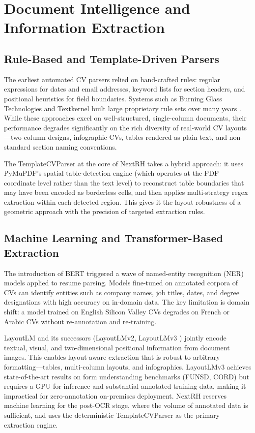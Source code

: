 \documentclass[12pt,a4paper,oneside,openany]{report}
\begin{document}
\section{Document Intelligence and Information Extraction}

\subsection{Rule-Based and Template-Driven Parsers}
The earliest automated \ac{CV} parsers relied on hand-crafted rules: regular expressions for dates and email addresses, keyword lists for section headers, and positional heuristics for field boundaries. Systems such as Burning Glass Technologies and Textkernel built large proprietary rule sets over many years \cite{borman2005document}. While these approaches excel on well-structured, single-column documents, their performance degrades significantly on the rich diversity of real-world \ac{CV} layouts---two-column designs, infographic \acp{CV}, tables rendered as plain text, and non-standard section naming conventions.

The TemplateCVParser at the core of NextRH takes a hybrid approach: it uses PyMuPDF's spatial table-detection engine (which operates at the PDF coordinate level rather than the text level) to reconstruct table boundaries that may have been encoded as borderless cells, and then applies multi-strategy regex extraction within each detected region. This gives it the layout robustness of a geometric approach with the precision of targeted extraction rules.

\subsection{Machine Learning and Transformer-Based Extraction}
The introduction of BERT \cite{devlin2019bert} triggered a wave of named-entity recognition (NER) models applied to resume parsing. Models fine-tuned on annotated corpora of \acp{CV} can identify entities such as company names, job titles, dates, and degree designations with high accuracy on in-domain data. The key limitation is domain shift: a model trained on English Silicon Valley \acp{CV} degrades on French or Arabic \acp{CV} without re-annotation and re-training.

LayoutLM \cite{xu2020layoutlm} and its successors (LayoutLMv2, LayoutLMv3 \cite{xu2022layoutlmv3}) jointly encode textual, visual, and two-dimensional positional information from document images. This enables layout-aware extraction that is robust to arbitrary formatting---tables, multi-column layouts, and infographics. LayoutLMv3 achieves state-of-the-art results on form understanding benchmarks (FUNSD, CORD) but requires a \ac{GPU} for inference and substantial annotated training data, making it impractical for zero-annotation on-premises deployment. NextRH reserves machine learning for the post-\ac{OCR} stage, where the volume of annotated data is sufficient, and uses the deterministic TemplateCVParser as the primary extraction engine.
\end{document}
